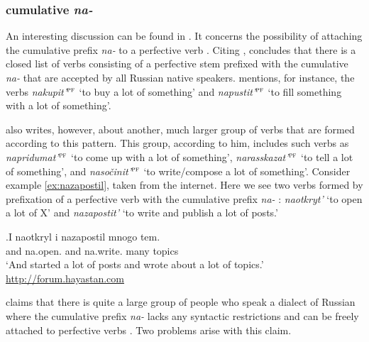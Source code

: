 \subsubsection{cumulative  \textit{na-}  }
An interesting discussion can be found in \citet{Tatevosov:13a}. It concerns the possibility of attaching the cumulative  prefix \textit{na-}   to a perfective verb . Citing \citet{Zaliznjak:03}, \citet{Tatevosov:13a} concludes that there is a closed list of verbs consisting of a perfective stem prefixed with the cumulative  \textit{na-}   that are accepted by all Russian native speakers. \citet{Tatevosov:13a} mentions, for instance, the verbs \textit{nakupit'}$^{\textsc{pf}}$ `to buy a lot of something' and \textit{napustit'}$^{\textsc{pf}}$ `to fill something with a lot of something'. 

\citeauthor{Tatevosov:13a} also writes, however, about another, much larger group of verbs that are formed according to this pattern. This group, according to him, includes such verbs as \textit{napridumat'}$^{\textsc{pf}}$ `to come up with a lot of something', \textit{narasskazat'}$^{\textsc{pf}}$ `to tell a lot of something', and \textit{naso\v{c}init'}$^{\textsc{pf}}$ `to write/compose a lot of something'. Consider example \ref{ex:nazapostil}, taken from the internet. Here we see two verbs formed by prefixation  of a perfective verb  with the cumulative  prefix \textit{na-}  : \textit{naotkryt'} `to open a lot of X' and \textit{nazapostit'} `to write and publish a lot of posts.'
 
\exg.\label{ex:nazapostil}I naotkryl i nazapostil mnogo tem.\\
and na.open. and {na.write.} {many} {topics}\\
\trans `And started a lot of posts and wrote about a lot of topics.'\\\hbox{}\hfill\hbox{\url{http://forum.hayastan.com}}

\citet{Tatevosov:13a} claims that there is quite a large group of people who speak a dialect of Russian where the cumulative  prefix \textit{na-}   lacks any syntactic restrictions and can be freely attached to perfective verbs . Two problems arise with this claim.

